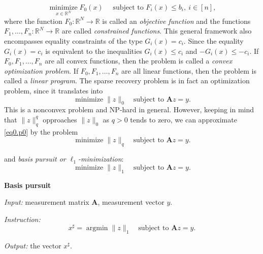 \[
    \mathop{\text{minimize}}\limits_{x \in \mathbb{R}^N} F_0(x) \quad \text{ subject to } F_i(x) \leq b_i,\ i \in [n],
\]
where the function $F_0 : \mathbb{R}^N \rightarrow \mathbb{R}$ is called an \emph{\textcolor[rgb]{1,0,0}{objective function}} and the functions $F_1,\dots,F_n : \mathbb{R}^N \rightarrow \mathbb{R}$ are called \emph{\textcolor[rgb]{1,0,0}{constrained functions}}. This general framework also encompasses equality constraints of the type $G_i(x) = c_i$. Since the equality $G_i(x) = c_i$ is equivalent to the inequalities $G_i(x) \leq c_i$ and $-G_i(x) \leq -c_i$. If $F_0, F_1, \dots, F_n$ are all convex functions, then the problem is called a \emph{\textcolor[rgb]{1,0,0}{convex optimization problem}}. If $F_0, F_1, \dots, F_n$ are all linear functions, then the problem is called a \emph{\textcolor[rgb]{1,0,0}{linear program}}. The sparse recovery problem is in fact an optimization problem, since it translates into
\begin{equation}
    \mathop{\mathrm{minimize}}\|z\|_0 \quad \text{subject to } \mathbf{A}z = y. \tag{$P_0$}
    \label{eq0.p0}
\end{equation}
This is a nonconvex problem and NP-hard in general. However, keeping in mind that $\|z\|_q^q$ opproaches $\|z\|_0$ as $q>0$ tends to zero, we can approximate \cref{eq0.p0} by the problem
\begin{equation}
    \mathop{\mathrm{minimize}}\|z\|_q \quad \text{subject to } \mathbf{A}z = y. \tag{$P_q$}
    \label{eq0.pq}
\end{equation}

and \emph{\textcolor[rgb]{1,0,0}{basis pursuit or $\ell_1$-minimization}}:
\begin{equation}
    \mathop{\mathrm{minimize}} \|z\|_1 \quad \text{subject to } \mathbf{A}z = y. \tag{$P_1$}
    \label{eq0.p1}
\end{equation}

\begin{mdframed}
    \label{bp}
    \begin{center}
        \textbf{\textcolor[rgb]{1,0,0}{Basis pursuit}}
    \end{center}
    \emph{Input:} measurement matrix $\mathbf{A}$, measurement vector $y$.

    \emph{Instruction:} 
    \begin{equation}
        x^{\sharp} = \mathop{\mathrm{argmin}} \|z\|_1 \quad \text{subject to } \mathbf{A}z = y. \tag{BP}
        \label{eqbp}
    \end{equation}

    \emph{Output:} the vector $x^{\sharp}$.
\end{mdframed}

